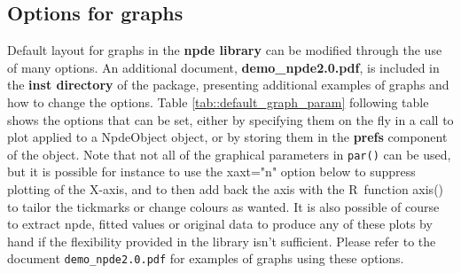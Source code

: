\documentclass[11pt,a4paper]{report}
\begin{document}
 
\subsection{Options for graphs}
\begin{sloppypar}
Default layout for graphs in the \textbf{npde library} can be modified through the use of many options. An additional document, \textbf{demo\_npde2.0.pdf}, is included in the \textbf{inst directory} of the package, presenting additional examples of graphs and how to change the options. Table \ref{tab::default_graph_param} following table shows the options that can be set, either by specifying them on the fly in a call to plot applied to a NpdeObject object, or by storing them in the \textbf{prefs} component of the object. Note that not all of the graphical parameters in \texttt{par()} can be used, but it is possible for instance to use the {\sf xaxt="n"} option below to suppress plotting of the X-axis, and to then add back the axis with the R~function {\sf axis()} to tailor the tickmarks or change colours as wanted. It is also possible of course to extract npde, fitted values or original data to produce any of these plots by hand if the flexibility provided in the library isn't sufficient. Please refer to the document \verb+demo_npde2.0.pdf+ for examples of graphs using these options.
\end{sloppypar}
\end{document}
